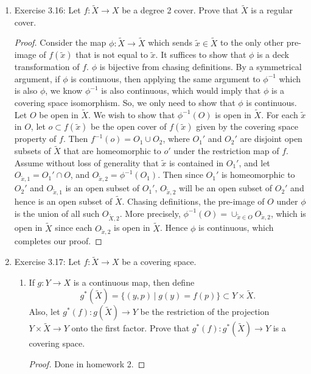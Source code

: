 \documentclass{article}
\begin{document}
\begin{enumerate}
  \item Exercise 3.16: Let $f:\tilde{X}\rightarrow X$ be a degree 2 cover.
    Prove that $\tilde{X}$ is a regular cover.
    \begin{proof}
      Consider the map $\phi:\tilde{X}\rightarrow\tilde{X}$ which sends
      $\tilde{x}\in\tilde{X}$ to the only other pre-image of $f(\tilde{x})$
      that is not equal to $\tilde{x}$. It suffices to show that $\phi$ is
      a deck transformation of $f$. $\phi$ is bijective from chasing
      definitions. By a symmetrical argument, if $\phi$ is continuous, then
      applying the same argument to $\phi^{-1}$ which is also $\phi$, we
      know $\phi^{-1}$ is also continuous, which would imply that $\phi$ is
      a covering space isomorphism. So, we only need to show that $\phi$ is
      continuous. \\

      Let $O$ be open in $\tilde{X}$. We wish to show that $\phi^{-1}(O)$
      is open in $\tilde{X}$. For each $\tilde{x}$ in $O$, let $o\subset
      f(\tilde{x})$ be the open cover of $f(\tilde{x})$ given by the
      covering space property of $f$. Then $f^{-1}(o)=O_1\cup O_2$, where
      $O_1'$ and $O_2'$ are disjoint open subsets of $\tilde{X}$ that are
      homeomorphic to $o'$ under the restriction map of $f$. Assume without
      loss of generality that $\tilde{x}$ is contained in $O_1'$, and let
      $O_{\tilde{x},1}=O_1'\cap O$, and $O_{\tilde{x},2}=\phi^{-1}(O_1)$.
      Then since $O_1'$ is homeomorphic to $O_2'$ and $O_{\tilde{x},1}$ is
      an open subset of $O_1'$, $O_{\tilde{x},2}$ will be an open subset of
      $O_2'$ and hence is an open subset of $\tilde{X}$. Chasing
      definitions, the pre-image of $O$ under $\phi$ is the union of all
      such $O_{\tilde{X},2}$. More precisely,
      $\phi^{-1}(O)=\cup_{\tilde{x}\in O}O_{\tilde{x},2}$, which is open in
      $\tilde{X}$ since each $O_{\tilde{x},2}$ is open in $\tilde{X}$.
      Hence $\phi$ is continuous, which completes our proof.
    \end{proof}

  \item Exercise 3.17: Let $f:\tilde{X}\rightarrow X$ be a covering space.
    \begin{enumerate}
      \item If $g:Y\rightarrow X$ is a continuous map, then define
        \begin{equation*}
          g^*(\tilde{X}) = \{(y,p)\,|\; g(y)=f(p)\}\subset
          Y\times\tilde{X}.
        \end{equation*}
        Also, let $g^*(f):g(\tilde{X})\rightarrow Y$ be the restriction of
        the projection $Y\times\tilde{X}\rightarrow Y$ onto the first
        factor. Prove that $g^*(f):g^*(\tilde{X})\rightarrow Y$ is a
        covering space.
        \begin{proof}
          Done in homework 2.
        \end{proof}


\end{enumerate}
\end{enumerate}
\end{document}
